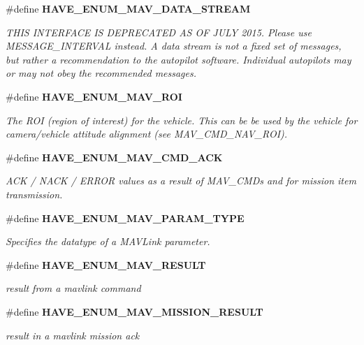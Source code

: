 \begin{DoxyCompactItemize}
\#define \textbf{ H\+A\+V\+E\+\_\+\+E\+N\+U\+M\+\_\+\+M\+A\+V\+\_\+\+D\+A\+T\+A\+\_\+\+S\+T\+R\+E\+AM}
\begin{DoxyCompactList}\small\item\em T\+H\+IS I\+N\+T\+E\+R\+F\+A\+CE IS D\+E\+P\+R\+E\+C\+A\+T\+ED AS OF J\+U\+LY 2015. Please use M\+E\+S\+S\+A\+G\+E\+\_\+\+I\+N\+T\+E\+R\+V\+AL instead. A data stream is not a fixed set of messages, but rather a recommendation to the autopilot software. Individual autopilots may or may not obey the recommended messages. \end{DoxyCompactList}\item 
\#define \textbf{ H\+A\+V\+E\+\_\+\+E\+N\+U\+M\+\_\+\+M\+A\+V\+\_\+\+R\+OI}
\begin{DoxyCompactList}\small\item\em The R\+OI (region of interest) for the vehicle. This can be be used by the vehicle for camera/vehicle attitude alignment (see M\+A\+V\+\_\+\+C\+M\+D\+\_\+\+N\+A\+V\+\_\+\+R\+OI). \end{DoxyCompactList}\item 
\#define \textbf{ H\+A\+V\+E\+\_\+\+E\+N\+U\+M\+\_\+\+M\+A\+V\+\_\+\+C\+M\+D\+\_\+\+A\+CK}
\begin{DoxyCompactList}\small\item\em A\+CK / N\+A\+CK / E\+R\+R\+OR values as a result of M\+A\+V\+\_\+\+C\+M\+Ds and for mission item transmission. \end{DoxyCompactList}\item 
\#define \textbf{ H\+A\+V\+E\+\_\+\+E\+N\+U\+M\+\_\+\+M\+A\+V\+\_\+\+P\+A\+R\+A\+M\+\_\+\+T\+Y\+PE}
\begin{DoxyCompactList}\small\item\em Specifies the datatype of a M\+A\+V\+Link parameter. \end{DoxyCompactList}\item 
\#define \textbf{ H\+A\+V\+E\+\_\+\+E\+N\+U\+M\+\_\+\+M\+A\+V\+\_\+\+R\+E\+S\+U\+LT}
\begin{DoxyCompactList}\small\item\em result from a mavlink command \end{DoxyCompactList}\item 
\#define \textbf{ H\+A\+V\+E\+\_\+\+E\+N\+U\+M\+\_\+\+M\+A\+V\+\_\+\+M\+I\+S\+S\+I\+O\+N\+\_\+\+R\+E\+S\+U\+LT}
\begin{DoxyCompactList}\small\item\em result in a mavlink mission ack \end{DoxyCompactList}\item 

\end{DoxyCompactItemize}
